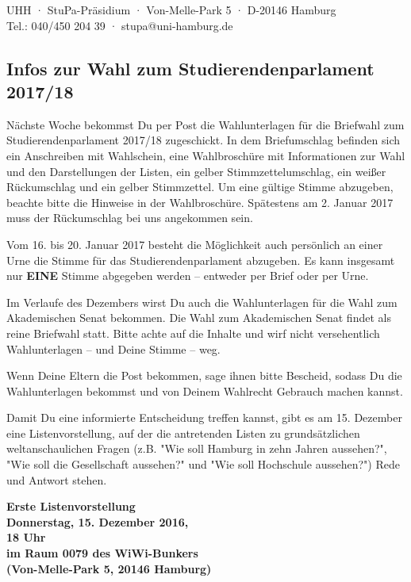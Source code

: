 \documentclass[a5paper,ngerman,headheight=80pt,10pt,DIV=calc]{scrartcl}
\begin{document}
    UHH · StuPa-Präsidium · Von-Melle-Park 5 · D-20146 Hamburg\\
    Tel.: 040/450 204 39 · stupa@uni-hamburg.de

    \subsection*{Infos zur Wahl zum Studierendenparlament 2017/18}

    Nächste Woche bekommst Du per Post die Wahlunterlagen für die Briefwahl
    zum Studierendenparlament 2017/18 zugeschickt. In dem Briefumschlag befinden
    sich ein Anschreiben mit Wahlschein, eine
    Wahlbroschüre mit Informationen zur Wahl und den Darstellungen der Listen,
    ein gelber Stimmzettelumschlag, ein weißer Rückumschlag und ein gelber
    Stimmzettel. Um eine gültige Stimme abzugeben, beachte bitte die Hinweise
    in der Wahlbroschüre. Spätestens am 2. Januar 2017 muss der Rückumschlag
    bei uns angekommen sein.

    Vom 16. bis 20. Januar 2017 besteht die Möglichkeit auch persönlich an einer
    Urne die Stimme für das Studierendenparlament abzugeben. Es kann insgesamt
    nur \textbf{EINE} Stimme abgegeben werden -- entweder per Brief oder per
    Urne.

    Im Verlaufe des Dezembers wirst Du auch die Wahlunterlagen für die Wahl
    zum Akademischen Senat bekommen. Die Wahl zum Akademischen Senat findet
    als reine Briefwahl statt. Bitte achte auf die Inhalte und wirf nicht
    versehentlich Wahlunterlagen -- und Deine Stimme -- weg.

    Wenn Deine Eltern die Post bekommen, sage ihnen bitte Bescheid, sodass Du
    die Wahlunterlagen bekommst und von Deinem Wahlrecht Gebrauch machen kannst.

    Damit Du eine informierte Entscheidung treffen kannst, gibt es am 15. Dezember
    eine Listenvorstellung, auf der die antretenden Listen zu grundsätzlichen
    weltanschaulichen Fragen (z.B. "Wie soll Hamburg in zehn Jahren aussehen?",
    "Wie soll die Gesellschaft aussehen?" und "Wie soll Hochschule aussehen?")
    Rede und Antwort stehen.

    \begin{center}
        \textbf{
        Erste Listenvorstellung\\
        Donnerstag, 15. Dezember 2016,\\
        18 Uhr\\
        im Raum 0079 des WiWi-Bunkers\\
        (Von-Melle-Park 5, 20146 Hamburg)}
    \end{center}
\end{document}
